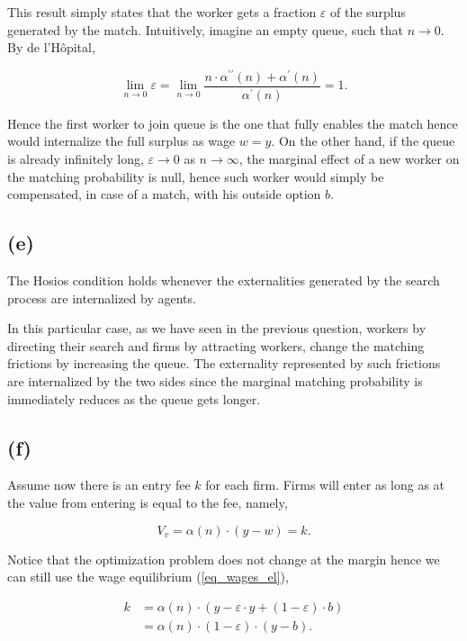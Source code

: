 \documentclass[american]{scrartcl}
\begin{document}
This result simply states that the worker gets a fraction $\varepsilon$ of the surplus generated by the match. Intuitively, imagine an empty queue, such that $n \xrightarrow{} 0$. By de l'Hôpital,

\begin{equation}
    \lim_{n \xrightarrow{} 0} \varepsilon = \lim_{n \xrightarrow{} 0} \frac{n \cdot \alpha^{\prime\prime}(n) + \alpha^\prime(n)}{\alpha^\prime(n)} = 1.
\end{equation}

Hence the first worker to join queue is the one that fully enables the match hence would internalize the full surplus as wage $w = y$. On the other hand, if the queue is already infinitely long, $\varepsilon \xrightarrow{} 0$ as $n \xrightarrow{} \infty$, the marginal effect of a new worker on the matching probability is null, hence such worker would simply be compensated, in case of a match, with his outside option $b$.

\subsection*{(e)}

The Hosios condition holds whenever the externalities generated by the search process are internalized by agents.

In this particular case, as we have seen in the previous question, workers by directing their search and firms by attracting workers, change the matching frictions by increasing the queue. The externality represented by such frictions are internalized by the two sides since the marginal matching probability is immediately reduces as the queue gets longer.

\subsection*{(f)}

Assume now there is an entry fee $k$ for each firm. Firms will enter as long as at the value from entering is equal to the fee, namely,

\begin{equation}
    V_v = \alpha(n) \cdot (y - w) = k.
\end{equation}

Notice that the optimization problem does not change at the margin hence we can still use the wage equilibrium (\ref{eq_wages_el}),

\begin{equation}
    \begin{split}
        k &= \alpha(n) \cdot(y - \varepsilon \cdot y + (1 - \varepsilon) \cdot b)\\
        &= \alpha(n) \cdot (1 - \varepsilon) \cdot (y - b).
    \end{split}
\end{equation}
\end{document}

